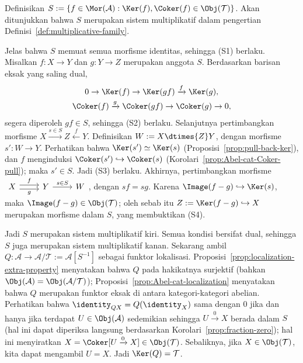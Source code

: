 \begin{bukti}
Definisikan
$S:=\left\{f\in\Mor(\mathcal{A}):\Ker(f),\Coker(f)\in\Obj(\mathcal{T})\right\}$.
Akan ditunjukkan bahwa $S$ merupakan sistem multiplikatif dalam pengertian
Definisi~\ref{def:multiplicative-family}.

Jelas bahwa $S$ memuat semua morfisme identitas, sehingga (S1) berlaku.
Misalkan $f:X\to Y$ dan $g:Y\to Z$ merupakan anggota $S$. Berdasarkan
barisan eksak yang saling dual,
\begin{gather*}
	0\to\Ker(f)\to\Ker(gf)\xrightarrow{f}\Ker(g),\\
	\Coker(f)\xrightarrow{g}\Coker(gf)\to\Coker(g)\to0,
\end{gather*}
segera diperoleh $gf\in S$, sehingga (S2) berlaku. Selanjutnya pertimbangkan
morfisme $X\xrightarrow{s\in S}Z\xleftarrow{f}Y$. Definisikan
$W:=X\dtimes{Z}Y$, dengan morfisme $s':W\to Y$. Perhatikan bahwa
$\Ker(s')\simeq\Ker(s)$ (Proposisi~\ref{prop:pull-back-ker}), dan $f$
menginduksi $\Coker(s')\hookrightarrow\Coker(s)$
(Korolari~\ref{prop:Abel-cat-Coker-pull}); maka $s'\in S$. Jadi (S3) berlaku.
Akhirnya, pertimbangkan morfisme
$\begin{tikzcd}
	X \arrow[r, "f", shift left] \arrow[r, "g"', shift right] &
	Y \arrow[r, "s \in S"] & W
\end{tikzcd}$,
dengan $sf=sg$. Karena $\Image(f-g)\hookrightarrow\Ker(s)$, maka
$\Image(f-g)\in\Obj(\mathcal{T})$; oleh sebab itu
$Z:=\Ker(f-g)\hookrightarrow X$ merupakan morfisme dalam $S$, yang membuktikan
(S4).

Jadi $S$ merupakan sistem multiplikatif kiri. Semua kondisi bersifat dual,
sehingga $S$ juga merupakan sistem multiplikatif kanan. Sekarang ambil
$Q:\mathcal{A}\to\mathcal{A}/\mathcal{T}:=\mathcal{A}[S^{-1}]$ sebagai
funktor lokalisasi. Proposisi~\ref{prop:localization-extra-property}
menyatakan bahwa $Q$ pada hakikatnya surjektif (bahkan
$\Obj(\mathcal{A})=\Obj(\mathcal{A}/\mathcal{T})$);
Proposisi~\ref{prop:Abel-cat-localization} menyatakan bahwa $Q$ merupakan
funktor eksak di antara kategori-kategori abelian. Perhatikan bahwa
$\identity_{QX}=Q(\identity_X)$ sama dengan $0$ jika dan hanya jika terdapat
$U\in\Obj(\mathcal{A})$ sedemikian sehingga $U\xrightarrow{0}X$ berada dalam
$S$ (hal ini dapat diperiksa langsung berdasarkan
Korolari~\ref{prop:fraction-zero}); hal ini menyiratkan
$X=\Coker[U\xrightarrow{0}X]\in\Obj(\mathcal{T})$. Sebaliknya, jika
$X\in\Obj(\mathcal{T})$, kita dapat mengambil $U=X$. Jadi
$\Ker(Q)=\mathcal{T}$.


\end{bukti}
